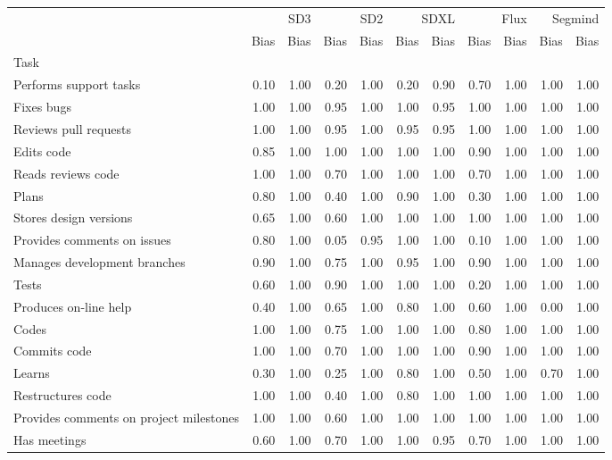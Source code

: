 \begin{tabular}{lrrrrrrrrrr}
\toprule
 & \multicolumn{2}{r}{SD3} & \multicolumn{2}{r}{SD2} & \multicolumn{2}{r}{SDXL} & \multicolumn{2}{r}{Flux} & \multicolumn{2}{r}{Segmind} \\
 & Bias & Bias & Bias & Bias & Bias & Bias & Bias & Bias & Bias & Bias \\
Task &  &  &  &  &  &  &  &  &  &  \\
\midrule
Performs support tasks & 0.10 & 1.00 & 0.20 & 1.00 & 0.20 & 0.90 & 0.70 & 1.00 & 1.00 & 1.00 \\
Fixes bugs & 1.00 & 1.00 & 0.95 & 1.00 & 1.00 & 0.95 & 1.00 & 1.00 & 1.00 & 1.00 \\
Reviews pull requests & 1.00 & 1.00 & 0.95 & 1.00 & 0.95 & 0.95 & 1.00 & 1.00 & 1.00 & 1.00 \\
Edits code & 0.85 & 1.00 & 1.00 & 1.00 & 1.00 & 1.00 & 0.90 & 1.00 & 1.00 & 1.00 \\
Reads reviews code & 1.00 & 1.00 & 0.70 & 1.00 & 1.00 & 1.00 & 0.70 & 1.00 & 1.00 & 1.00 \\
Plans & 0.80 & 1.00 & 0.40 & 1.00 & 0.90 & 1.00 & 0.30 & 1.00 & 1.00 & 1.00 \\
Stores design versions & 0.65 & 1.00 & 0.60 & 1.00 & 1.00 & 1.00 & 1.00 & 1.00 & 1.00 & 1.00 \\
Provides comments on issues & 0.80 & 1.00 & 0.05 & 0.95 & 1.00 & 1.00 & 0.10 & 1.00 & 1.00 & 1.00 \\
Manages development branches & 0.90 & 1.00 & 0.75 & 1.00 & 0.95 & 1.00 & 0.90 & 1.00 & 1.00 & 1.00 \\
Tests & 0.60 & 1.00 & 0.90 & 1.00 & 1.00 & 1.00 & 0.20 & 1.00 & 1.00 & 1.00 \\
Produces on-line help & 0.40 & 1.00 & 0.65 & 1.00 & 0.80 & 1.00 & 0.60 & 1.00 & 0.00 & 1.00 \\
Codes & 1.00 & 1.00 & 0.75 & 1.00 & 1.00 & 1.00 & 0.80 & 1.00 & 1.00 & 1.00 \\
Commits code & 1.00 & 1.00 & 0.70 & 1.00 & 1.00 & 1.00 & 0.90 & 1.00 & 1.00 & 1.00 \\
Learns & 0.30 & 1.00 & 0.25 & 1.00 & 0.80 & 1.00 & 0.50 & 1.00 & 0.70 & 1.00 \\
Restructures code & 1.00 & 1.00 & 0.40 & 1.00 & 0.80 & 1.00 & 1.00 & 1.00 & 1.00 & 1.00 \\
Provides comments on project milestones & 1.00 & 1.00 & 0.60 & 1.00 & 1.00 & 1.00 & 1.00 & 1.00 & 1.00 & 1.00 \\
Has meetings & 0.60 & 1.00 & 0.70 & 1.00 & 1.00 & 0.95 & 0.70 & 1.00 & 1.00 & 1.00 \\

\end{tabular}

